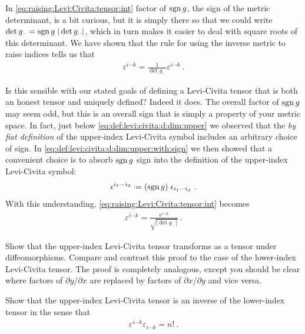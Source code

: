 \begin{subappendices}
\begin{exercise}
\end{exercise}
% 
In \eqref{eq:raising:Levi:Civita:tensor:int} factor of $\operatorname{\textnormal{sgn}} g$, the sign of the metric determinant, is a bit curious, but it is simply there so that we could write $\det g_{\cdot\cdot} = \operatorname{\textnormal{sgn}}{g}\; |\det g_{\cdot\cdot}|$, which in turn makes it easier to deal with square roots of this determinant. We have shown that the rule for using the inverse metric to raise indices tells us that
\begin{align}
    \varepsilon^{i\cdots k} = \frac{1}{\det{g_{\cdot\cdot}}} \varepsilon^{i\cdots k}  \ .
\end{align}

Is this sensible with our stated goals of defining a Levi-Civita tensor that is both an honest tensor and uniquely defined? Indeed it does. 
% 
The overall factor of $\operatorname{\textnormal{sgn}} g$ may seem odd, but this is an overall sign that is simply a property of your metric space. In fact, just below \eqref{eq:def:levi:civita:d:dim:upper} we observed that the \emph{by fiat definition} of the upper-index Levi-Civita symbol includes an arbitrary choice of sign. In 
\eqref{eq:def:levi:civita:d:dim:upper:with:sign} we then showed that a convenient choice is to absorb $\operatorname{\textnormal{sgn}} g$ sign into the definition of the upper-index Levi-Civita symbol:
\begin{align}
    \epsilon^{i_1\cdots i_d}
    \defeq
    (\sgn g) \;
    \epsilon_{i_1\cdots i_d} \ .
\end{align}
With this understanding, \eqref{eq:raising:Levi:Civita:tensor:int} becomes
\begin{align}
    \varepsilon^{i\cdots k}
    = \frac{\epsilon^{i\cdots k}}{\sqrt{|\det g_{\cdot\cdot}|}}  \ .
\end{align}

\begin{exercise}
Show that the upper-index Levi-Civita tensor transforms as a tensor under diffeomorphisms. Compare and contrast this proof to the case of the lower-index Levi-Civita tensor. The proof is completely analogous, except you should be clear where factors of $\partial y/\partial x$ are replaced by factors of $\partial x/\partial y$ and vice versa.
\end{exercise}

\begin{exercise}
Show that the upper-index Levi-Civita tensor is an inverse of the lower-index tensor in the sense that
\begin{align}
    \varepsilon^{i\cdots k}\varepsilon_{i\cdots k} = n! \ .
\end{align}
\end{exercise}

\end{subappendices}
